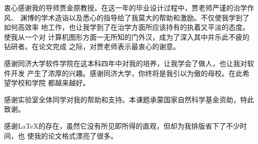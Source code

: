 

\begin{ack}
  衷心感谢我的导师贾金原教授。在这一年的毕业设计过程中，贾老师严谨的治学作风、
  渊博的学术造诣以及悉心的指导给了我莫大的帮助和激励。不仅使我学到了如何高效率
  地工作，也让我学到了在治学方面所应该持有的执着又平淡的态度。使我从一个对
  计算机图形方面一无所知的门外汉，成为了深入其中并乐此不疲的钻研者。在论文完成
  之际，对贾老师表示最衷心的谢意。

  感谢同济大学软件学院在这本科四年中对我的培养，让我学会了做人，也让我对软件开发
  产生了浓厚的兴趣。感谢同济大学，你终将是我引以为傲的母校。在此希望学校和学院
  都越来越好。
  
  感谢实验室全体同学对我的帮助和支持。本课题承蒙国家自然科学基金资助，特此致谢。

  感谢\LaTeX{}的存在，虽然它没有所见即所得的直观，但却为我排版省下了不少时间，也
  使我的论文格式漂亮了很多。

\end{ack}
